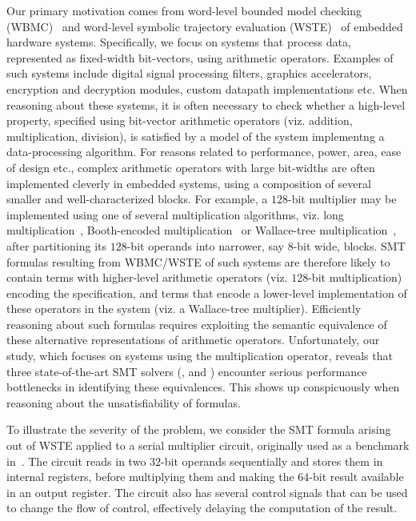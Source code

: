 Our primary motivation comes from word-level bounded model checking
(WBMC)~\cite{cbmc,hwcbmc} and word-level symbolic trajectory
evaluation (WSTE)~\cite{wste} of embedded hardware systems.
Specifically, we focus on systems that process data, represented as
fixed-width bit-vectors, using arithmetic operators.  Examples of such
systems include digital signal processing filters, graphics
accelerators, encryption and decryption modules, custom datapath
implementations etc.  When reasoning about these systems, it is often
necessary to check whether a high-level property, specified using
bit-vector arithmetic operators (viz. addition, multiplication,
division), is satisfied by a model of the system implementng a
data-processing algorithm.  For reasons related to performance, power,
area, ease of design etc., complex arithmetic operators with large
bit-widths are often implemented cleverly in embedded systems, using a
composition of several smaller and well-characterized blocks.  For
example, a $128$-bit multiplier may be implemented using one of
several multiplication algorithms, viz. long
multiplication~\cite{long-mult}, Booth-encoded
multiplication~\cite{booth-mult} or Wallace-tree
multiplication~\cite{wallace-mult}, after partitioning its $128$-bit
operands into narrower, say $8$-bit wide, blocks.  SMT formulas
resulting from WBMC/WSTE of such systems are therefore likely to
contain terms with higher-level arithmetic operators (viz. $128$-bit
multiplication) encoding the specification, and terms that encode a
lower-level implementation of these operators in the system (viz. a
Wallace-tree multiplier).  Efficiently reasoning about such formulas
requires exploiting the semantic equivalence of these alternative
representations of arithmetic operators.  Unfortunately, our study,
which focuses on systems using the multiplication operator, reveals
that three state-of-the-art SMT solvers ({\zthree}, {\cvcfour} and
{\boolector}) encounter serious performance bottlenecks in identifying
these equivalences.  This shows up conspicuously when reasoning about
the unsatisfiability of formulas.

 To illustrate
the severity of the problem, we consider the SMT formula arising out
of WSTE applied to a serial multiplier circuit, originally used as a
benchmark in~\cite{wste}.  The circuit reads in two $32$-bit operands
sequentially and stores them in internal registers, before multiplying
them and making the $64$-bit result available in an output register.
The circuit also has several control signals that can be used to
change the flow of control, effectively delaying the computation of
the result.

